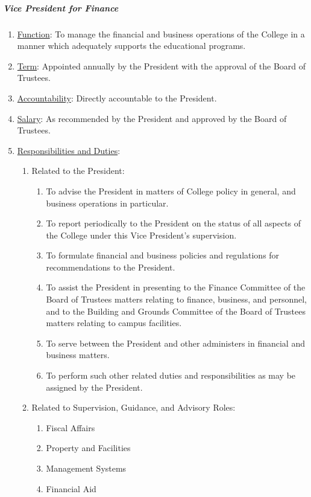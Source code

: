 				\subparagraph{Vice President for Finance}
					\begin{enumerate}
						\item{\underline{Function}: To manage the financial and business operations of the College in a manner which adequately supports the educational programs.}
						\item{\underline{Term}: Appointed annually by the President with the approval of the Board of Trustees.}
						\item{\underline{Accountability}: Directly accountable to the President.}
						\item{\underline{Salary}: As recommended by the President and approved by the Board of Trustees.}
						\item{\underline{Responsibilities and Duties}:
							\begin{enumerate}
								\item{Related to the President:
									\begin{enumerate}
										\item{To advise the President in matters of College policy in general, and business operations in particular.}
										\item{To report periodically to the President on the status of all aspects of the College under this Vice President's supervision.}
										\item{To formulate financial and business policies and regulations for recommendations to the President.}
										\item{To assist the President in presenting to the Finance Committee of the Board of Trustees matters relating to finance, business, and personnel, and to the Building and Grounds Committee of the Board of Trustees matters relating to campus facilities.}
										\item{To serve between the President and other administers in financial and business matters.}
										\item{To perform such other related duties and responsibilities as may be assigned by the President.}
									\end{enumerate}
								}
								\item{Related to Supervision, Guidance, and Advisory Roles:
									\begin{enumerate}
										\item{Fiscal Affairs}
										\item{Property and Facilities}
										\item{Management Systems}
										\item{Financial Aid}
									\end{enumerate}
								}
							\end{enumerate}
						}
					\end{enumerate}

